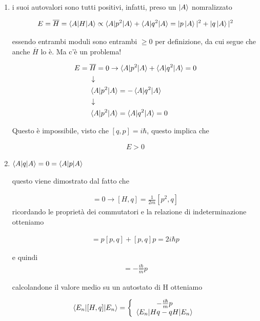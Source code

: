 \begin{enumerate}
	\item i suoi autovalori sono tutti positivi, infatti, preso un $\ket{A}$ nomralizzato
	
	\begin{align}
	E=\overline{H}= \braket{A |H| A} \propto \braket{A |p^2| A}  + \braket{A |q^2| A} = |p \ket{A}|^2 +  |q\ket{A}|^2
	\end{align}
	
	essendo entrambi moduli sono entrambi $\geq 0$ per definizione, da cui segue che anche $\overline{H}$ lo è. Ma c'è un problema!
	
	\begin{align}
	E={}&\overline{H}=0 \rightarrow \braket{A |p^2| A}  + \braket{A |q^2| A} = 0 \nonumber \\
	&\downarrow\nonumber \\
	&\braket{A |p^2| A}  = -\braket{A |q^2| A} \nonumber \\
	&\downarrow\nonumber \\
	&\braket{A |p^2| A}  = \braket{A |q^2| A} = 0
	\end{align}
	
	Questo è impossibile, visto che $[q,p]=i\hbar$, questo implica che 
	
	\begin{align}
	E > 0
	\end{align}
	
	\item $\braket{A |q| A} = 0 = \braket{A |p| A}$
	
	 questo viene dimostrato dal fatto che
	 
	 \begin{align}
	 [V(q), q]=0 \rightarrow  [H,q]= \frac{1}{2m}[p^2,q]
	 \end{align}
	 ricordando le proprietà dei commutatori e la relazione di indeterminazione otteniamo
	 
	 \begin{align}
	 [p^2,q] = p[p,q] + [p,q]p= 2i\hbar p
	 \end{align}
	 
	 e quindi
	 \begin{align}
	 [H,q]= -\frac{i \hbar}{m}p
	 \end{align}
	 
	 calcolandone il valore medio su un autostato di H otteniamo
	 
	 \begin{align}
	 \braket{E_n|[H,q]|E_n} = \left\{
	 \begin{array}{cc}
		-\frac{i \hbar}{m}p \\
		\braket{E_n|Hq - qH|E_n}
	 \end{array}
	 \right.
	 \end{align}
	 

\end{enumerate}
